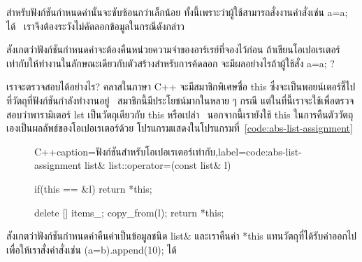 สำหรับ{\wbr}ฟังก์ชัน{\wbr}กำหนด{\wbr}ค่า{\wbr}นั้น{\wbr}จะ{\wbr}ซับซ้อน{\wbr}กว่า{\wbr}เล็กน้อย{\wbr}
ทั้งนี้เพราะ{\wbr}ว่า{\wbr}ผู้ใช้{\wbr}สามารถ{\wbr}สั่ง{\wbr}งาน{\wbr}คำสั่ง{\wbr}เช่น {\ct a=a;} ได้{\wbr}
\ เรา{\wbr}จึง{\wbr}ต้อง{\wbr}ระวัง{\wbr}ไม่{\wbr}คัดลอก{\wbr}ข้อมูล{\wbr}ใน{\wbr}กรณี{\wbr}ดังกล่าว{\wbr}

\begin{quiz}{}
สังเกต{\wbr}ว่า{\wbr}ฟังก์ชัน{\wbr}กำหนด{\wbr}ค่า{\wbr}จะ{\wbr}ต้อง{\wbr}คืน{\wbr}หน่วยความจำ{\wbr}ของ{\wbr}อาร์เรย์{\wbr}ที่{\wbr}จอง{\wbr}ไว้{\wbr}ก่อน{\wbr}
ถ้า{\wbr}เขียน{\wbr}โอ{\wbr}เปอเรเตอร์{\wbr}เท่า{\wbr}กับ{\wbr}ให้{\wbr}ทำงาน{\wbr}ใน{\wbr}ลักษณะ{\wbr}เดียวกับ{\wbr}ตัว{\wbr}สร้าง{\wbr}สำหรับ{\wbr}การ{\wbr}ค้{\wbr}ดล{\wbr}อก{\wbr}
จะ{\wbr}มี{\wbr}ผล{\wbr}อย่างไร{\wbr}ถ้า{\wbr}ผู้ใช้{\wbr}สั่ง {\ct a=a;} ?
\end{quiz}

เรา{\wbr}จะ{\wbr}ตรวจสอบ{\wbr}ได้{\wbr}อย่างไร?  ค{\wbr}ลา{\wbr}ส{\wbr}ใน{\wbr}ภาษา C++ จะ{\wbr}มี{\wbr}สมาชิกพิเศษ{\wbr}ชื่อ {\ct this}
ซึ่ง{\wbr}จะ{\wbr}เป็น{\wbr}พอยน์เตอร์{\wbr}ชี้{\wbr}ไป{\wbr}ที่{\wbr}วัตถุ{\wbr}ที่{\wbr}ฟังก์ชัน{\wbr}กำลัง{\wbr}ทำงาน{\wbr}อยู่ \ สมาชิก{\wbr}นี้{\wbr}มี{\wbr}ประโยชน์{\wbr}มาก{\wbr}ใน{\wbr}หลาย ๆ
กรณี แต่{\wbr}ใน{\wbr}ที่นี้{\wbr}เรา{\wbr}จะ{\wbr}ใช้{\wbr}เพื่อ{\wbr}ตรวจสอบ{\wbr}ว่า{\wbr}พารามิเตอร์ {\ct lst} เป็น{\wbr}วัตถุ{\wbr}เดียวกับ {\ct
  this} หรือเปล่า \ นอกจากนี้{\wbr}เรา{\wbr}ยัง{\wbr}ใช้ {\ct this}
ใน{\wbr}การ{\wbr}คืนตัว{\wbr}วัตถุ{\wbr}เอง{\wbr}เป็น{\wbr}ผลลัพธ์{\wbr}ของ{\wbr}โอ{\wbr}เปอเรเตอร์{\wbr}ด้วย{\wbr}
โปรแกรม{\wbr}แสดง{\wbr}ใน{\wbr}โปรแกรม{\wbr}ที่~\ref{code:abs-list-assignment}

\begin{figure}
\latintext
\begin{codelist}{C++}{caption={\thaitext ฟังก์ชัน{\wbr}สำหรับ{\wbr}โอ{\wbr}เปอเรเตอร์{\wbr}เท่า{\wbr}กับ\latintext},label=code:abs-list-assignment}
list& list::operator=(const list& l)
{
  if(this == &l)
    return *this;

  delete [] items_;
  copy_from(l);
  return *this;
}
\end{codelist}
\thaitext
\end{figure}

สังเกต{\wbr}ว่า{\wbr}ฟังก์ชัน{\wbr}กำหนด{\wbr}ค่า{\wbr}คืน{\wbr}ค่า{\wbr}เป็น{\wbr}ข้อมูล{\wbr}ชนิด {\ct list\&} และ{\wbr}เรา{\wbr}คืน{\wbr}ค่า {\ct
  *this} แทน{\wbr}วัตถุ{\wbr}ที่{\wbr}ได้{\wbr}รับ{\wbr}ค่า{\wbr}ออก{\wbr}ไป เพื่อให้{\wbr}เรา{\wbr}สั่ง{\wbr}คำสั่ง{\wbr}เช่น {\ct
  (a=b).append(10); } ได้{\wbr}


